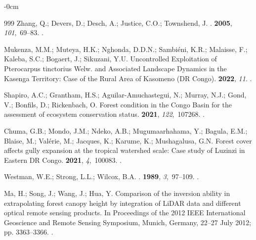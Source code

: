 \documentclass[applsci,article,accept,pdftex,moreauthors]{Definitions/mdpi}
\begin{document}
\begin{adjustwidth}{-\extralength}{0cm}
\begin{thebibliography}{999}
Zhang, Q.; Devers, D.; Desch, A.; Justice, C.O.; Townshend, J.
.
 {\bf 2005}, {\em
  101},~69--83.
.

Mukenza, M.M.; Muteya, H.K.; Nghonda, D.D.N.; Sambiéni, K.R.; Malaisse, F.;
  Kaleba, S.C.; Bogaert, J.; Sikuzani, Y.U.
\newblock Uncontrolled Exploitation of Pterocarpus tinctorius Welw. and
  Associated Landscape Dynamics in the Kasenga Territory: Case of the Rural
  Area of Kasomeno (DR Congo).
 {\bf 2022}, {\em 11}.
.

Shapiro, A.C.; Grantham, H.S.; Aguilar-Amuchastegui, N.; Murray, N.J.; Gond,
  V.; Bonfils, D.; Rickenbach, O.
\newblock Forest condition in the Congo Basin for the assessment of ecosystem
  conservation status.
 {\bf 2021}, {\em 122},~107268.
.

Chuma, G.B.; Mondo, J.M.; Ndeko, A.B.; Mugumaarhahama, Y.; Bagula, E.M.;
  Blaise, M.; Valérie, M.; Jacques, K.; Karume, K.; Mushagalusa, G.N.
\newblock Forest cover affects gully expansion at the tropical watershed scale:
  Case study of Luzinzi in Eastern DR Congo.
 {\bf 2021}, {\em 4},~100083.
.

Westman, W.E.; Strong, L.L.; Wilcox, B.A.
.
 {\bf 1989}, {\em 3},~97--109.
.

Ma, H.; Song, J.; Wang, J.; Hua, Y.
\newblock Comparison of the inversion ability in extrapolating forest canopy
  height by integration of LiDAR data and different optical remote sensing
  products.
\newblock In Proceedings of the 2012 IEEE International Geoscience and Remote
  Sensing Symposium,   {Munich, Germany, 22--27 July  2012;} pp. 3363--3366.
.


\end{thebibliography}
\end{adjustwidth}
\end{document}
